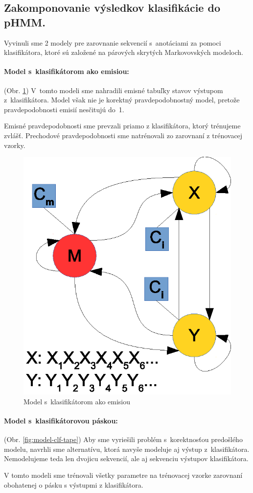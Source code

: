 \documentclass[myposter,portrait]{sciposter}
\def\mysection#1{
{\color{SectionCol}\section*{\sc\bfseries #1}}}
\begin{document}
\begin{multicols*}{3}
\mysection{Zakomponovanie výsledkov klasifikácie do pHMM.}

Vyvinuli sme 2 modely pre zarovnanie sekvencií s~anotáciami za pomoci klasifikátora, ktoré sú založené na párových skrytých Markovovských modeloch.

\paragraph{Model s~klasifikátorom ako emisiou:} (Obr. \ref{fig:model-clf})
V~tomto modeli sme nahradili emisné tabuľky stavov výstupom z~klasifikátora.
Model však nie je korektný pravdepodobnostný model, pretože pravdepodobnosti emisií nesčitujú do~1.

Emisné pravdepodobnosti sme prevzali priamo z klasifikátora, ktorý trénujeme zvlášť. Prechodové pravdepodobnosti sme natrénovali zo zarovnaní z trénovacej vzorky.

\begin{figure}[htp]
        \centering
        \includegraphics[width=.5\textwidth, clip=true]{images/model_clf}
        \caption{Model s~klasifikátorom ako emisiou}
        \label{fig:model-clf}
\end{figure}


\paragraph{Model s~klasifikátorovou páskou:} (Obr. \ref{fig:model-clf-tape})
Aby sme vyriešili problém s~korektnosťou predošlého modelu, navrhli sme alternatívu, ktorá navyše modeluje aj výstup z~klasifikátora.
Nemodelujeme teda len dvojicu sekvencií, ale aj sekvenciu výstupov klasifikátora.

V tomto modeli sme trénovali všetky parametre na trénovacej vzorke zarovnaní obohatenej o pásku s výstupmi z klasifikátora.


\end{multicols*}
\end{document}
